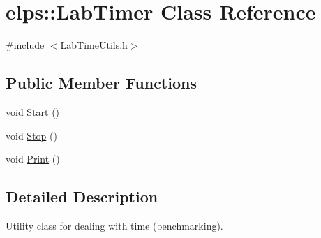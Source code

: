 \hypertarget{classelps_1_1_lab_timer}{\section{elps\-:\-:Lab\-Timer Class Reference}
\label{classelps_1_1_lab_timer}
}


{\ttfamily \#include $<$Lab\-Time\-Utils.\-h$>$}

\subsection*{Public Member Functions}
\begin{DoxyCompactItemize}
\item 
void \hyperlink{classelps_1_1_lab_timer_a254ec0abf4837982f16229c9d51703fb}{Start} ()
\item 
void \hyperlink{classelps_1_1_lab_timer_a32bf0ba963184fa4244eca3b40804604}{Stop} ()
\item 
void \hyperlink{classelps_1_1_lab_timer_af371935d2082a0ab98eb3d492714f950}{Print} ()
\end{DoxyCompactItemize}


\subsection{Detailed Description}
Utility class for dealing with time (benchmarking). 

